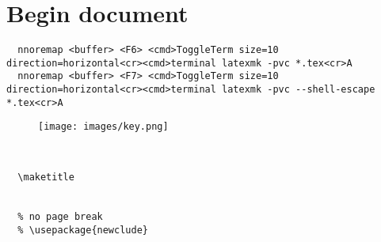 \newpage

\section{Begin document \textcolor{green}{} \textcolor{blue}{}  \textcolor{cyan}{} }
\begin{verbatim}
  nnoremap <buffer> <F6> <cmd>ToggleTerm size=10 direction=horizontal<cr><cmd>terminal latexmk -pvc *.tex<cr>A
  nnoremap <buffer> <F7> <cmd>ToggleTerm size=10 direction=horizontal<cr><cmd>terminal latexmk -pvc --shell-escape *.tex<cr>A
\end{verbatim}

\begin{figure}[hbt!]
\centering
\begin{minipage}{0.95\textwidth}
  \centering
  \texttt{[image: images/key.png]}
\end{minipage}
\end{figure}

\begin{verbatim}
  

  \maketitle


  % no page break
  % \usepackage{newclude}
  
  

  
  
  
  
  

  
\end{verbatim}

\newpage
